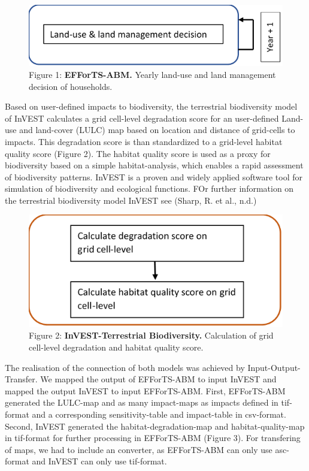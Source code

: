 \documentclass[
]{article}
\begin{document}
\begin{figure}
\centering
\includegraphics{figures/png/Economic_simple.png}
\caption{Figure 1: \textbf{EFForTS-ABM.} Yearly land-use and land
management decision of households.}
\end{figure}

Based on user-defined impacts to biodiversity, the terrestrial
biodiversity model of InVEST calculates a grid cell-level degradation
score for an user-defined Land-use and land-cover (LULC) map based on
location and distance of grid-cells to impacts. This degradation score
is than standardized to a grid-level habitat quality score (Figure 2).
The habitat quality score is used as a proxy for biodiversity based on a
simple habitat-analysis, which enables a rapid assessment of
biodiversity patterns. InVEST is a proven and widely applied software
tool for simulation of biodiversity and ecological functions. FOr
further information on the terrestrial biodiversity model InVEST see
(Sharp, R. et al., n.d.)

\begin{figure}
\centering
\includegraphics{figures/png/InVEST.png}
\caption{Figure 2: \textbf{InVEST-Terrestrial Biodiversity.} Calculation
of grid cell-level degradation and habitat quality score.}
\end{figure}

The realisation of the connection of both models was achieved by
Input-Output-Transfer. We mapped the output of EFForTS-ABM to input
InVEST and mapped the output InVEST to input EFForTS-ABM. First,
EFForTS-ABM generated the LULC-map and as many impact-maps as impacts
defined in tif-format and a corresponding sensitivity-table and
impact-table in csv-format. Second, InVEST generated the
habitat-degradation-map and habitat-quality-map in tif-format for
further processing in EFForTS-ABM (Figure 3). For transfering of maps,
we had to include an converter, as EFForTS-ABM can only use asc-format
and InVEST can only use tif-format.
\end{document}
